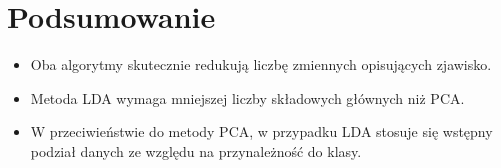 \documentclass[10pt,a4paper]{article}
\begin{document}
\section{Podsumowanie}
\begin{itemize}
    \item Oba algorytmy skutecznie redukują liczbę zmiennych opisujących zjawisko.
    \item Metoda LDA wymaga mniejszej liczby składowych głównych niż PCA.
    \item W przeciwieństwie do metody PCA, w przypadku LDA stosuje się wstępny podział danych ze względu na przynależność do klasy.
\end{itemize}
\end{document}
